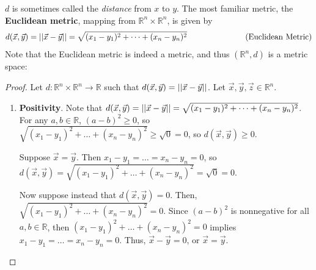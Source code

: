 $d$ is sometimes called the \textit{distance} from $x$ to $y$. The most familiar metric, the \textbf{Euclidean metric}, mapping from $\mathbb{R}^n\times\mathbb{R}^n$, is given by \begin{equation*}
    d(\vec{x},\vec{y}) = \left\lvert\left\lvert\vec{x}-\vec{y}\right\rvert\right\rvert = \sqrt{(x_1-y_1)^2+\dots+(x_n-y_n)^2}\hspace{1in}\text{(Euclidean Metric)}
\end{equation*} Note that the Euclidean metric is indeed a metric, and thus $(\mathbb{R}^n,d)$ is a metric space:
\begin{proof}
    Let $d:\mathbb{R}^n\times\mathbb{R}^n\to\mathbb{R}$ such that $d(\vec{x},\vec{y}) = \left\lvert\left\lvert\vec{x}-\vec{y}\right\rvert\right\rvert$. Let $\vec{x},\vec{y},\vec{z}\in\mathbb{R}^n$.
    \vspace{-1em}
    \begin{enumerate}
        \item[] \textbf{Positivity}. Note that $d(\vec{x},\vec{y}) = \left\lvert\left\lvert\vec{x}-\vec{y}\right\rvert\right\rvert = \sqrt{(x_1-y_1)^2+\dots+(x_n-y_n)^2}$. For any $a,b\in\mathbb{R}$, $(a-b)^2\geq 0$, so $\sqrt{(x_1-y_1)^2+\dots+(x_n-y_n)^2} \geq \sqrt{0} = 0$, so $d(\vec{x},\vec{y})\geq 0$.
        
        
        Suppose $\vec{x}=\vec{y}$. Then $x_1-y_1 = \dots = x_n-y_n=0$, so $d(\vec{x},\vec{y}) = \sqrt{(x_1-y_1)^2 + \dots + (x_n-y_n)^2} = \sqrt{0} = 0$. 
        
        Now suppose instead that $d(\vec{x},\vec{y})=0$. Then, $\sqrt{(x_1-y_1)^2+\dots+(x_n-y_n)^2} = 0$. Since $(a-b)^2$ is nonnegative for all $a,b\in\mathbb{R}$, then $(x_1-y_1)^2+\dots+(x_n-y_n)^2 = 0$ implies $x_1-y_1 = \dots = x_n-y_n = 0$. Thus, $\vec{x}-\vec{y} = 0$, or $\vec{x}=\vec{y}$.


\end{enumerate}
\end{proof}
